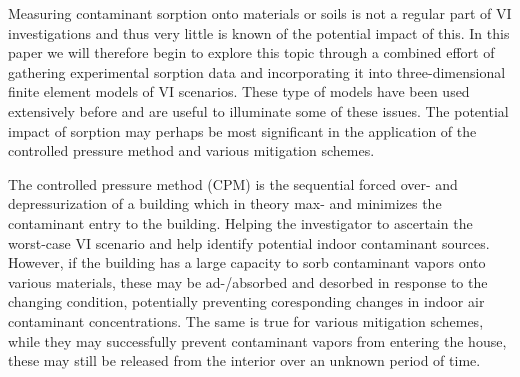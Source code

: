 Measuring contaminant sorption onto materials or soils is not a regular part of VI investigations and thus very little is known of the potential impact of this.
In this paper we will therefore begin to explore this topic through a combined effort of gathering experimental sorption data and incorporating it into three-dimensional finite element models of VI scenarios.
These type of models have been used extensively before and are useful to illuminate some of these issues.
The potential impact of sorption may perhaps be most significant in the application of the controlled pressure method and various mitigation schemes.\par

The controlled pressure method (CPM) is the sequential forced over- and depressurization of a building which in theory max- and minimizes the contaminant entry to the building.
Helping the investigator to ascertain the worst-case VI scenario and help identify potential indoor contaminant sources.
However, if the building has a large capacity to sorb contaminant vapors onto various materials, these may be ad-/absorbed and desorbed in response to the changing condition, potentially preventing coresponding changes in indoor air contaminant concentrations.
The same is true for various mitigation schemes, while they may successfully prevent contaminant vapors from entering the house, these may still be released from the interior over an unknown period of time.\par





